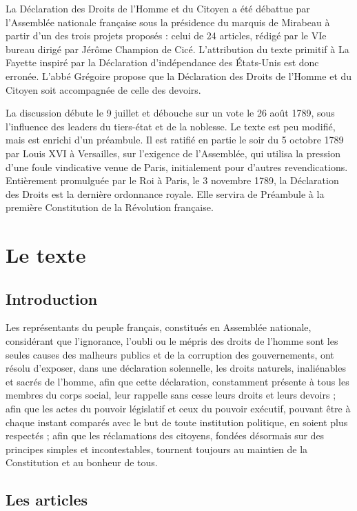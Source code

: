 \documentclass[a4paper,10pt]{book}
\begin{document}
La Déclaration des Droits de l'Homme et du Citoyen a été débattue par l'Assemblée nationale française sous la présidence du marquis de Mirabeau à partir d'un des trois projets proposés : celui de 24 articles, rédigé par le VIe bureau dirigé par Jérôme Champion de Cicé. L'attribution du texte primitif à La Fayette inspiré par la Déclaration d'indépendance des États-Unis est donc erronée. L'abbé Grégoire propose que la Déclaration des Droits de l'Homme et du Citoyen soit accompagnée de celle des devoirs.

La discussion débute le 9 juillet et débouche sur un vote le 26 août 1789, sous l'influence des leaders du tiers-état et de la noblesse. Le texte est peu modifié, mais est enrichi d'un préambule. Il est ratifié en partie le soir du 5 octobre 1789 par Louis XVI à Versailles, sur l'exigence de l'Assemblée, qui utilisa la pression d'une foule vindicative venue de Paris, initialement pour d'autres revendications.
Entièrement promulguée par le Roi à Paris, le 3 novembre 1789, la Déclaration des Droits est la dernière ordonnance royale. Elle servira de Préambule à la première Constitution de la Révolution française.
\chapter{Le texte}

\section{Introduction}
Les représentants du peuple français, constitués en Assemblée nationale, considérant que l'ignorance, l'oubli ou le mépris des droits de l'homme sont les seules causes des malheurs publics et de la corruption des gouvernements, ont résolu d'exposer, dans une déclaration solennelle, les droits naturels, inaliénables et sacrés de l'homme, afin que cette déclaration, constamment présente à tous les membres du corps social, leur rappelle sans cesse leurs droits et leurs devoirs ; afin que les actes du pouvoir législatif et ceux du pouvoir exécutif, pouvant être à chaque instant comparés avec le but de toute institution politique, en soient plus respectés ; afin que les réclamations des citoyens, fondées désormais sur des principes simples et incontestables, tournent toujours au maintien de la Constitution et au bonheur de tous.

\section{Les articles}
\end{document}
